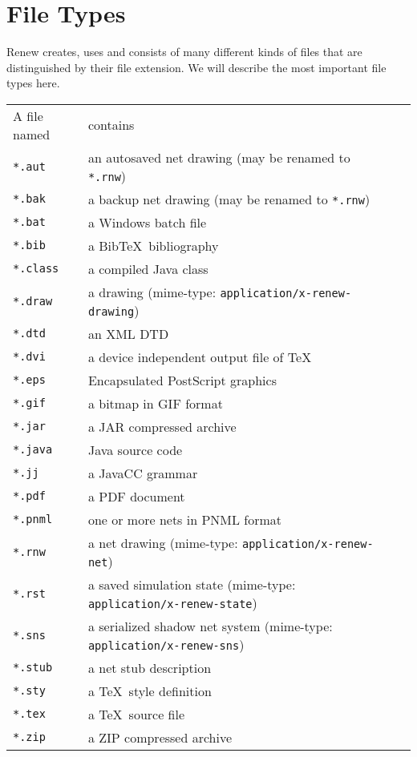 \chapter{File Types}

Renew creates, uses and consists of many different kinds
of files that are distinguished by their file extension.
We will describe the most important file types here.

\bigskip

\noindent\begin{tabular}{@{}lll@{}}
A file named     & contains \\[1ex]
\texttt{*.aut}   & an autosaved net drawing
(may be renamed to \texttt{*.rnw}) \\
\texttt{*.bak}   & a backup net drawing
(may be renamed to \texttt{*.rnw}) \\
\texttt{*.bat}   & a Windows batch file \\
\texttt{*.bib}   & a Bib\TeX\ bibliography \\
\texttt{*.class} & a compiled Java class \\
\texttt{*.draw}  & a drawing (mime-type: \texttt{application/x-renew-drawing})\\
\texttt{*.dtd}   & an XML DTD \\
\texttt{*.dvi}   & a device independent output file of \TeX \\
\texttt{*.eps}   & Encapsulated PostScript graphics \\
\texttt{*.gif}   & a bitmap in GIF format \\
\texttt{*.jar}   & a JAR compressed archive \\
\texttt{*.java}  & Java source code \\
\texttt{*.jj}    & a JavaCC grammar \\
\texttt{*.pdf}   & a PDF document \\
\texttt{*.pnml}  & one or more nets in PNML format \\
\texttt{*.rnw}   & a net drawing (mime-type: \texttt{application/x-renew-net})\\
\texttt{*.rst}   & a saved simulation state (mime-type: \texttt{application/x-renew-state})\\
\texttt{*.sns}   & a serialized shadow net system (mime-type: \texttt{application/x-renew-sns})\\
\texttt{*.stub}  & a net stub description \\
\texttt{*.sty}   & a \TeX\ style definition \\
\texttt{*.tex}   & a \TeX\ source file \\
\texttt{*.zip}   & a ZIP compressed archive \\
\end{tabular}

